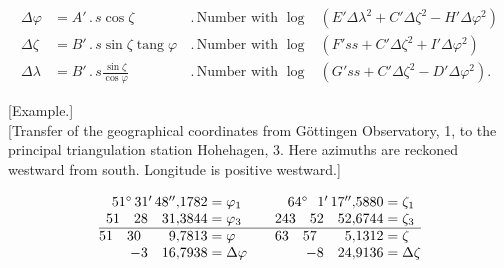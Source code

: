 \[
\begin{alignedat}{2}
\Delta\varphi&=A'\,.\,s\cos\zeta
&\,.\,\text{Number with }\log&(E'\Delta\lambda^2+C'\Delta\zeta^2-H'\Delta\varphi^2)\\
\Delta\zeta&=B'\,.\,s\sin\zeta\operatorname{tang}\varphi
&\,.\,\text{Number with }\log&(F'ss+C'\Delta\zeta^2+I'\Delta\varphi^2)\\
\Delta\lambda&=B'\,.\,s\frac{\sin\zeta}{\cos\varphi}
&\,.\,\text{Number with }\log&(G'ss+C'\Delta\zeta^2-D'\Delta\varphi^2).
\end{alignedat}
\]

\begin{center}
[Example.]\\[.5ex]
{[Transfer of the geographical coordinates from Göttingen Observatory, 1,
to the principal triangulation station Hohehagen, 3. Here azimuths are
reckoned westward from south. Longitude is positive westward.]}
\end{center}
\[
\begin{array}{@{}r@{\;}l@{\qquad}r@{\;}l@{}}
51^\circ\,31'\,48''{,}1782&=\varphi_1&64^\circ\phantom{0}\,1'\,17''{,}5880&=\zeta_1\\
51\quad28\quad31{,}3844&=\varphi_3&243\quad52\quad52{,}6744&=\zeta_3\\
\hline
51\quad30\qquad9{,}7813&=\varphi&63\quad57\qquad5{,}1312&=\zeta\\
-3\quad16{,}7938&=\Delta\varphi&-8\quad24{,}9136&=\Delta\zeta
\end{array}
\]

